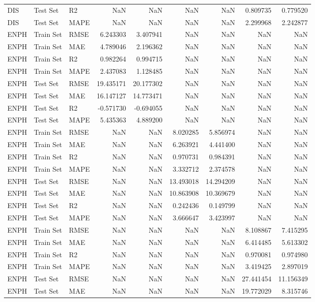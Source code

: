\begin{tabular}{lllrrrrrr}
DIS & Test Set & R2 & NaN & NaN & NaN & NaN & 0.809735 & 0.779520 \\
DIS & Test Set & MAPE & NaN & NaN & NaN & NaN & 2.299968 & 2.242877 \\
ENPH & Train Set & RMSE & 6.243303 & 3.407941 & NaN & NaN & NaN & NaN \\
ENPH & Train Set & MAE & 4.789046 & 2.196362 & NaN & NaN & NaN & NaN \\
ENPH & Train Set & R2 & 0.982264 & 0.994715 & NaN & NaN & NaN & NaN \\
ENPH & Train Set & MAPE & 2.437083 & 1.128485 & NaN & NaN & NaN & NaN \\
ENPH & Test Set & RMSE & 19.435171 & 20.177302 & NaN & NaN & NaN & NaN \\
ENPH & Test Set & MAE & 16.147127 & 14.773471 & NaN & NaN & NaN & NaN \\
ENPH & Test Set & R2 & -0.571730 & -0.694055 & NaN & NaN & NaN & NaN \\
ENPH & Test Set & MAPE & 5.435363 & 4.889200 & NaN & NaN & NaN & NaN \\
ENPH & Train Set & RMSE & NaN & NaN & 8.020285 & 5.856974 & NaN & NaN \\
ENPH & Train Set & MAE & NaN & NaN & 6.263921 & 4.441400 & NaN & NaN \\
ENPH & Train Set & R2 & NaN & NaN & 0.970731 & 0.984391 & NaN & NaN \\
ENPH & Train Set & MAPE & NaN & NaN & 3.332712 & 2.374578 & NaN & NaN \\
ENPH & Test Set & RMSE & NaN & NaN & 13.493018 & 14.294209 & NaN & NaN \\
ENPH & Test Set & MAE & NaN & NaN & 10.863908 & 10.369679 & NaN & NaN \\
ENPH & Test Set & R2 & NaN & NaN & 0.242436 & 0.149799 & NaN & NaN \\
ENPH & Test Set & MAPE & NaN & NaN & 3.666647 & 3.423997 & NaN & NaN \\
ENPH & Train Set & RMSE & NaN & NaN & NaN & NaN & 8.108867 & 7.415295 \\
ENPH & Train Set & MAE & NaN & NaN & NaN & NaN & 6.414485 & 5.613302 \\
ENPH & Train Set & R2 & NaN & NaN & NaN & NaN & 0.970081 & 0.974980 \\
ENPH & Train Set & MAPE & NaN & NaN & NaN & NaN & 3.419425 & 2.897019 \\
ENPH & Test Set & RMSE & NaN & NaN & NaN & NaN & 27.441454 & 11.156349 \\
ENPH & Test Set & MAE & NaN & NaN & NaN & NaN & 19.772029 & 8.315746 \\

\end{tabular}
